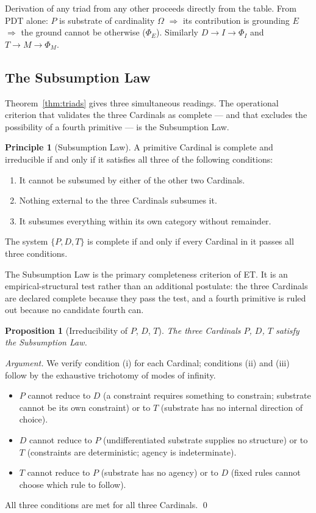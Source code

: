 \documentclass[11pt,a4paper]{article}
\newtheorem{proposition}[theorem]{Proposition}
\theoremstyle{definition}
\newtheorem{principle}[theorem]{Principle}
\theoremstyle{remark}
\begin{document}
Derivation of any triad from any other proceeds directly from the table. From PDT alone: $P$ is substrate of cardinality $\Omega$ $\Rightarrow$ its contribution is grounding $E$ $\Rightarrow$ the ground cannot be otherwise ($\Phi_{E}$). Similarly $D \to I \to \Phi_{I}$ and $T \to M \to \Phi_{M}$.

\subsection{The Subsumption Law}\label{subsec:subsumption}

Theorem~\ref{thm:triads} gives three simultaneous readings. The operational criterion that validates the three Cardinals as complete --- and that excludes the possibility of a fourth primitive --- is the Subsumption Law.

\begin{principle}[Subsumption Law]\label{princ:subsumption}
A primitive Cardinal is complete and irreducible if and only if it satisfies all three of the following conditions:
\begin{enumerate}[label=(\roman*),leftmargin=*]
\item It cannot be subsumed by either of the other two Cardinals.
\item Nothing external to the three Cardinals subsumes it.
\item It subsumes everything within its own category without remainder.
\end{enumerate}
The system $\{P,D,T\}$ is complete if and only if every Cardinal in it passes all three conditions.
\end{principle}

The Subsumption Law is the primary completeness criterion of ET. It is an empirical-structural test rather than an additional postulate: the three Cardinals are declared complete because they pass the test, and a fourth primitive is ruled out because no candidate fourth can.

\begin{proposition}[Irreducibility of $P$, $D$, $T$]\label{prop:irreducibility}
The three Cardinals $P$, $D$, $T$ satisfy the Subsumption Law.
\end{proposition}

\begin{proof}[Argument]
We verify condition (i) for each Cardinal; conditions (ii) and (iii) follow by the exhaustive trichotomy of modes of infinity.
\begin{itemize}[leftmargin=*]
\item $P$ cannot reduce to $D$ (a constraint requires something to constrain; substrate cannot be its own constraint) or to $T$ (substrate has no internal direction of choice).
\item $D$ cannot reduce to $P$ (undifferentiated substrate supplies no structure) or to $T$ (constraints are deterministic; agency is indeterminate).
\item $T$ cannot reduce to $P$ (substrate has no agency) or to $D$ (fixed rules cannot choose which rule to follow).
\end{itemize}
All three conditions are met for all three Cardinals. \qed
\end{proof}
\end{document}
